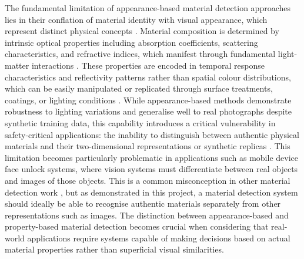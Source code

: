 \documentclass[12pt,a4paper,oneside]{report}
\begin{document}
The fundamental limitation of appearance-based material detection approaches lies in their conflation of material identity with visual appearance, which represent distinct physical concepts \cite{schwartz2013,sharan2013,chen2024}. Material composition is determined by intrinsic optical properties including absorption coefficients, scattering characteristics, and refractive indices, which manifest through fundamental light-matter interactions \cite{elachi2021,bass2010,su2016}. These properties are encoded in temporal response characteristics and reflectivity patterns rather than spatial colour distributions, which can be easily manipulated or replicated through surface treatments, coatings, or lighting conditions \cite{su2016,becker2023,tafone2023}. While appearance-based methods demonstrate robustness to lighting variations and generalise well to real photographs despite synthetic training data, this capability introduces a critical vulnerability in safety-critical applications: the inability to distinguish between authentic physical materials and their two-dimensional representations or synthetic replicas \cite{chen2024}. This limitation becomes particularly problematic in applications such as mobile device face unlock systems, where vision systems must differentiate between real objects and images of those objects. This is a common misconception in other material detection work \cite{chen2024}, but as demonstrated in this project, a material detection system should ideally be able to recognise authentic materials separately from other representations such as images. The distinction between appearance-based and property-based material detection becomes crucial when considering that real-world applications require systems capable of making decisions based on actual material properties rather than superficial visual similarities.
\end{document}
